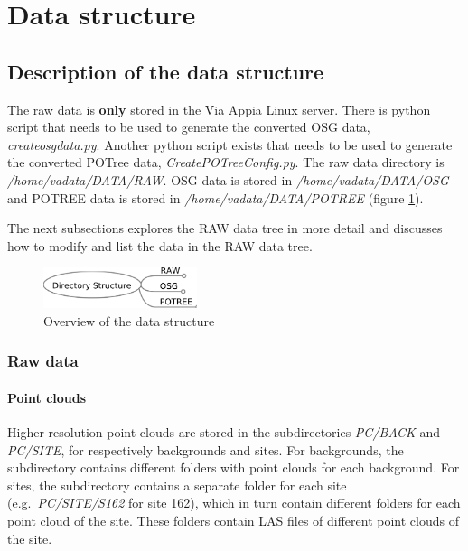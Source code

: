 \section{Data structure}
\label{sec:data_structure}

\subsection{Description of the data structure}
\label{sec:descriptiondata}
The raw data is \textbf{only} stored in the Via Appia Linux server. There is python script that needs to be used to generate the converted OSG data, \textit{createosgdata.py}. Another python script exists that needs to be used to generate the converted POTree data, \textit{CreatePOTreeConfig.py}.
The raw data directory is \textit{/home/vadata/DATA/RAW}. OSG data is stored in \textit{/home/vadata/DATA/OSG} and POTREE data is stored in \textit{/home/vadata/DATA/POTREE} (figure \ref{fig:directory_structure_overview}). 

The next subsections explores the RAW data tree in more detail and discusses how to modify and list the data in the RAW data tree.

\begin{figure}[!ht]
 \centering
 \includegraphics[width=0.4\textwidth]{fig/data_structure/directory_structure_overview}
 \caption{Overview of the data structure}
 \label{fig:directory_structure_overview}
\end{figure}

\subsubsection{Raw data}
\paragraph{Point clouds}
Higher resolution point clouds are stored in the subdirectories \textit{PC/BACK} and \textit{PC/SITE}, for respectively backgrounds and sites. For backgrounds, the subdirectory contains different folders with point clouds for each background. For sites, the subdirectory contains a separate folder for each site (e.g.\ \textit{PC/SITE/S162} for site 162), which in turn contain different folders for each point cloud of the site. These folders contain LAS files of different point clouds of the site. 


